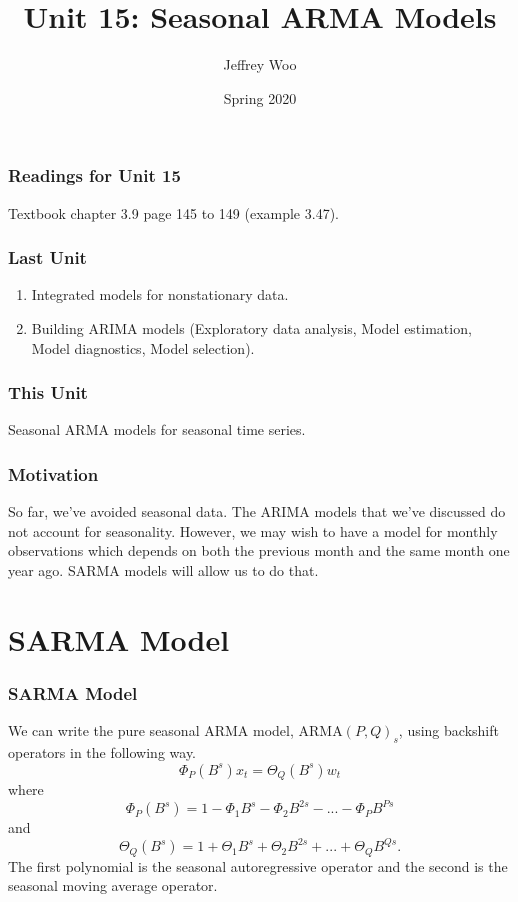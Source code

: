 \documentclass[%
xcolor=pdftex]{beamer}
\title{Unit 15: Seasonal ARMA Models}
\author[STAT 5170: Applied Time Series, Unit 15]{Jeffrey Woo}
\institute{Department of Statistics, University of Virginia}
\date{Spring 2020}
\begin{document}
\frame{\titlepage}


\begin{frame}
\frametitle{Readings for Unit 15}

Textbook chapter 3.9 page 145 to 149 (example 3.47).

\end{frame}



\begin{frame}
\frametitle{Last Unit}
\begin{enumerate}
\item Integrated models for nonstationary data.
\item Building ARIMA models (Exploratory data analysis, Model estimation, Model diagnostics, Model selection).
\end{enumerate}
\end{frame}

\begin{frame}
\frametitle{This Unit}

Seasonal ARMA models for seasonal time series.


\end{frame}


\begin{frame}
\frametitle{Motivation}

So far, we've avoided seasonal data. The ARIMA models that we've discussed do not account for seasonality. However, we may wish to have a model for monthly observations which depends on both the previous month and the same month one year ago. SARMA models will allow us to do that.

\end{frame}

\section{SARMA Model}
\frame{\tableofcontents[currentsection]}

\begin{frame}
\frametitle{SARMA Model}

We can write the pure seasonal ARMA model, ARMA$(P,Q)_s$, using backshift operators in the following way.
\begin{equation}
\Phi_P (B^s) x_t =\Theta_Q(B^s) w_t
\end{equation}
where
$$
\Phi_P(B^s)=1-\Phi_1 B^s-\Phi_2B^{2s}-...-\Phi_P B^{Ps}
$$
and
$$
\Theta_Q(B^s)=1+\Theta_1 B^s+\Theta_2B^{2s}+...+\Theta_Q B^{Qs}.
$$
The first polynomial is the seasonal autoregressive operator and the second is the seasonal moving average operator.



\end{frame}
\end{document}
